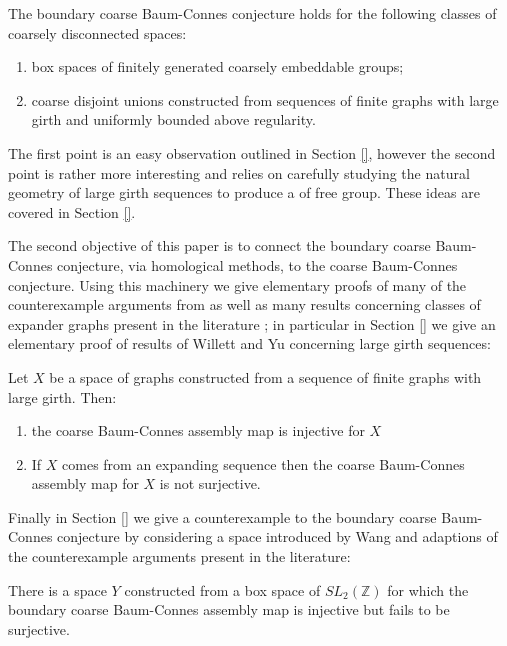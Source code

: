 \begin{thm}
The boundary coarse Baum-Connes conjecture holds for the following classes of coarsely disconnected spaces:
\begin{enumerate}
\item box spaces of finitely generated coarsely embeddable groups;
\item coarse disjoint unions constructed from sequences of finite graphs with large girth and uniformly bounded above regularity.
\end{enumerate}
\end{thm}

The first point is an easy observation outlined in Section \ref{}, however the second point is rather more interesting and relies on carefully studying the natural geometry of large girth sequences to produce a  of free group. These ideas are covered in Section \ref{}.

The second objective of this paper is to connect the boundary coarse Baum-Connes conjecture, via homological methods, to the coarse Baum-Connes conjecture. Using this machinery we give elementary proofs of many of the counterexample arguments from \cite{} as well as many results concerning classes of expander graphs present in the literature \cite{}; in particular in Section \ref{} we give an elementary proof of results of Willett and Yu \cite{} concerning large girth sequences:

\begin{thm}
Let $X$ be a space of graphs constructed from a sequence of finite graphs with large girth. Then:
\begin{enumerate}
\item the coarse Baum-Connes assembly map is injective for $X$
\item If $X$ comes from an expanding sequence then the coarse Baum-Connes assembly map for $X$ is not surjective.
\end{enumerate}
\end{thm} 

Finally in Section \ref{} we give a counterexample to the boundary coarse Baum-Connes conjecture by considering a space introduced by Wang \cite{} and adaptions of the counterexample arguments present in the literature:

\begin{thm}
There is a space $Y$ constructed from a box space of $SL_{2}(\mathbb{Z})$ for which the boundary coarse Baum-Connes assembly map is injective but fails to be surjective.
\end{thm}